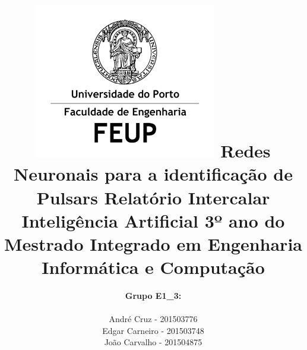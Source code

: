 \documentclass[a4paper]{article}
\begin{document}
\setlength{\textwidth}{16cm}
\setlength{\textheight}{22cm}
\title{
\includegraphics[scale=0.6]{images/feup-logo.png}\linebreak\linebreak\linebreak
\Huge\textbf{Redes Neuronais para a identificação de Pulsars}\linebreak\linebreak\linebreak
\Large\textbf{Relatório Intercalar}\linebreak\linebreak
\Large{Inteligência Artificial}\linebreak\linebreak\linebreak\linebreak\linebreak\linebreak
\Large{3º ano do Mestrado Integrado em Engenharia Informática e Computação}
}

\author{\textbf{Grupo E1\_3:}\\
\linebreak\\
André Cruz - 201503776 \\
Edgar Carneiro - 201503748 \\
João Carvalho - 201504875 \\
\vspace{1cm}}

\maketitle
\thispagestyle{empty}

\end{document}
